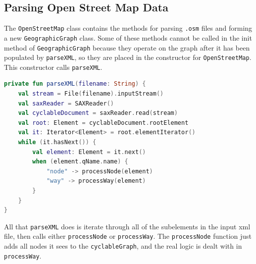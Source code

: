 \documentclass[11pt,twoside,a4paper]{report}
\begin{document}
\subsection{Parsing Open Street Map Data}
The \texttt{OpenStreetMap} class contains the methods for parsing \texttt{.osm} files and forming a new \texttt{GeographicGraph} class. Some of these methods cannot be called in the init method of \texttt{GeographicGraph} because 
they operate on the graph after it has been populated by \texttt{parseXML}, so they are placed in the constructor for \texttt{OpenStreetMap}. This constructor calls \texttt{parseXML}.
\begin{lstlisting}[language=kotlin]
private fun parseXML(filename: String) {
    val stream = File(filename).inputStream()
    val saxReader = SAXReader()
    val cyclableDocument = saxReader.read(stream)
    val root: Element = cyclableDocument.rootElement
    val it: Iterator<Element> = root.elementIterator()
    while (it.hasNext()) {
        val element: Element = it.next()
        when (element.qName.name) {
            "node" -> processNode(element)
            "way" -> processWay(element)
        }
    }
}
\end{lstlisting}
All that \texttt{parseXML} does is iterate through all of the subelements in the input xml file, then calls either \texttt{processNode} or \texttt{processWay}. The \texttt{processNode} function just adds all nodes it sees to the \texttt{cyclableGraph}, and the real logic is dealt with in \texttt{processWay}.
\end{document}
